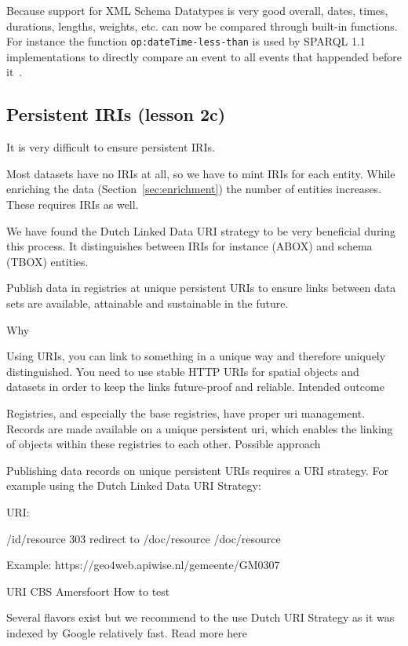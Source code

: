 \documentclass[a4paper]{scrartcl}
\newcommand{\textt}[1]{{\small \texttt{#1}}}
\begin{document}
Because support for XML Schema Datatypes is very good overall, dates,
times, durations, lengths, weights, etc. can now be compared through
built-in functions.  For instance the function
\textt{op:dateTime-less-than} is used by SPARQL 1.1 implementations to
directly compare an event to all events that happended before
it~\cite{xquery10}.


\subsection{Persistent IRIs (lesson 2c)}

It is very difficult to ensure persistent IRIs.

Most datasets have no IRIs at all, so we have to mint IRIs for each
entity.  While enriching the data (Section~\ref{sec:enrichment}) the
number of entities increases.  These requires IRIs as well.

We have found the Dutch Linked Data URI strategy to be very beneficial
during this process.  It distinguishes between IRIs for instance
(ABOX) and schema (TBOX) entities.

Publish data in registries at unique persistent URIs to ensure links between data sets are available, attainable and sustainable in the future.

Why

Using URIs, you can link to something in a unique way and therefore uniquely distinguished. You need to use stable HTTP URIs for spatial objects and datasets in order to keep the links future-proof and reliable.
Intended outcome

Registries, and especially the base registries, have proper uri management. Records are made available on a unique persistent uri, which enables the linking of objects within these registries to each other.
Possible approach

Publishing data records on unique persistent URIs requires a URI strategy. For example using the Dutch Linked Data URI Strategy:

URI:

    /id/{resource} 303 redirect to /doc/{resource}
    /doc/{resource}

Example: https://geo4web.apiwise.nl/gemeente/GM0307

URI CBS Amersfoort
How to test

Several flavors exist but we recommend to the use Dutch URI Strategy as it was indexed by Google relatively fast. Read more here 
\end{document}
